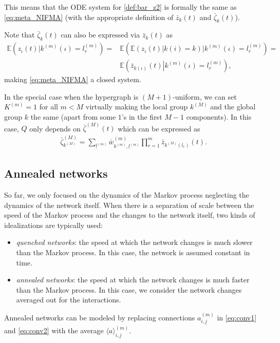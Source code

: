 \documentclass{article}
\newcommand{\E}{\mathbb{E}}
\newcommand{\1}[1]{{\mathds{1}}_{\left\{#1\right\}}}
\newcommand{\rem}[1]{{#1}}
\begin{document}
	This means that the ODE system for \eqref{def:bar_z2} is formally the same as \eqref{eq:meta_NIFMA} (with the appropriate definition of $\bar{z}_k(t)$ and $\bar{\zeta}_k(t)$)\rem{.}
	
	Note that $\bar{\zeta}_k(t)$ can also be expressed via $\bar{z}_{k}(t)$ as 
	\begin{align*}
		\E \left(\left. z_{\iota}(t) \right| k^{(m)}(\iota)=l_r^{(m)} \right)=&\E \left(\left. \E \left(\left.z_{\iota}(t) \right| k(i)=k \right) \right| k^{(m)}(\iota)=l_r^{(m)} \right)=\\
		&\E \left(\left. \bar{z}_{k(\iota)}(t) \right| k^{(m)}(\iota)=l_r^{(m)} \right),
	\end{align*}
	making \eqref{eq:meta_NIFMA} a closed system.
	
	In the special case when the hypergraph is $(M+1)$-uniform, we can set $K^{(m)}=1$ for all $m<M$ virtually making the local group $k^{(M)}$ and the global group $k$ the same (apart from some $1$'s in the first $M-1$ components). In this case, $Q$ only depends on $\bar{\zeta}^{(M)}(t)$ which can be expressed as
	\begin{align*}
		\bar{\zeta}_{k^{(M)}}^{(M)}=\sum_{\underline{l}^{(m)}}\bar{w}_{k^{(m)},\underline{l}^{(m)}}^{(m)}\prod_{r=1}^{m}\bar{z}_{k^{(M)}(l_r)}(t).
	\end{align*}
	
	
	\subsection{Annealed networks}
	
	So far, we only focused on the dynamics of the Markov process neglecting the dynamics of the network itself. When there is a separation of scale between the speed of the Markov process and the changes to the network itself, two kinds of idealizations are typically used: 
	\begin{itemize}
		\item \emph{quenched networks}: the speed at which the network changes is much slower than the Markov process. In this case, the network is assumed constant in time.
		\item \emph{annealed networks}: the speed at which the network changes is much faster than the Markov process. In this case, we consider the network changes averaged out for the interactions.
	\end{itemize}
	
	Annealed networks can be modeled by replacing connections $a_{i, \underline{j}}^{(m)}$ in \eqref{eq:conv1} and \eqref{eq:conv2} with the average $\langle a \rangle_{i, \underline{j}}^{(m)}$.
	
\end{document}
